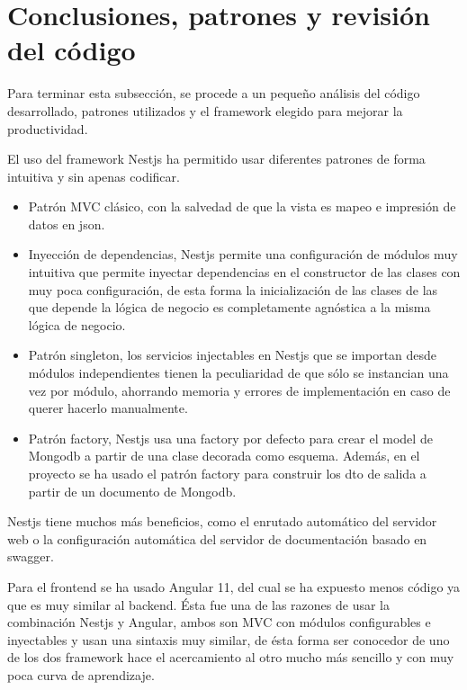 \section{Conclusiones, patrones y revisión del código}
Para terminar esta subsección, se procede a un pequeño análisis del código desarrollado, patrones utilizados y el framework elegido para mejorar la productividad.
\vspace{1em}
\par El uso del framework Nestjs ha permitido usar diferentes patrones de forma intuitiva y sin apenas codificar.
\begin{itemize}
    \item Patrón MVC clásico, con la salvedad de que la vista es mapeo e impresión de datos en json.
    \item Inyección de dependencias, Nestjs permite una configuración de módulos muy intuitiva que permite inyectar dependencias en el constructor de las clases con muy poca configuración, de esta forma la inicialización de las clases de las que depende la lógica de negocio es completamente agnóstica a la misma lógica de negocio.
    \item Patrón singleton, los servicios injectables en Nestjs que se importan desde módulos independientes tienen la peculiaridad de que sólo se instancian una vez por módulo, ahorrando memoria y errores de implementación en caso de querer hacerlo manualmente.
    \item Patrón factory, Nestjs usa una factory por defecto para crear el model de Mongodb a partir de una clase decorada como esquema. Además, en el proyecto se ha usado el patrón factory para construir los dto de salida a partir de un documento de Mongodb.
\end{itemize}
\vspace{1em}
\par Nestjs tiene muchos más beneficios, como el enrutado automático del servidor web o la configuración automática del servidor de documentación basado en swagger.
\vspace{1em}
\par Para el frontend se ha usado Angular 11, del cual se ha expuesto menos código ya que es muy similar al backend. Ésta fue una de las razones de usar la combinación Nestjs y Angular, ambos son MVC con módulos configurables e inyectables y usan una sintaxis muy similar, de ésta forma ser conocedor de uno de los dos framework hace el acercamiento al otro mucho más sencillo y con muy poca curva de aprendizaje.
\vspace{1em}
